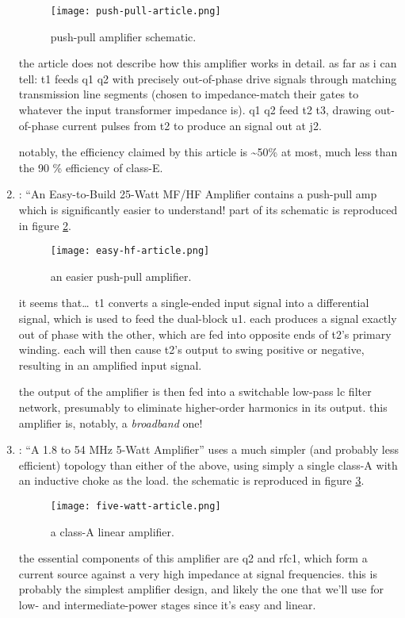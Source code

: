 \begin{enumerate}
	\begin{figure}[H]
		\centering
		\texttt{[image: push-pull-article.png]}
		\caption{push-pull amplifier schematic.}
		\label{fig:push-pull-article}
	\end{figure}

	the article does not describe how this amplifier works in detail. as
	far as i can tell: \pr t1 feeds \pr q1 \amp \pr q2 with precisely
	out-of-phase drive signals through matching transmission line segments
	 (chosen to impedance-match their gates to whatever
	the input transformer impedance is). \pr q1 \amp \pr q2 feed \pr t2
	\amp \pr t3, drawing out-of-phase current pulses from \pr t2 to produce
	an \rf signal out at \pr j2.

	notably, the efficiency claimed by this article is \textasciitilde 50\%
	at most, much less than the 90 \% efficiency of class-E.

	\item \autocite[p.~1 dash 2]{rf-amp-classics}: ``An Easy-to-Build
	25-Watt MF/HF Amplifier contains a push-pull amp which is significantly
	easier to understand! part of its schematic is reproduced in figure
	\ref{fig:easy-hf-article}.

	\begin{figure}[H]
		\centering
		\texttt{[image: easy-hf-article.png]}
		\caption{an easier push-pull amplifier.}
		\label{fig:easy-hf-article}
	\end{figure}

	it seems that\ldots\ \pr t1 converts a single-ended input signal into a
	differential signal, which is used to feed the dual-\jfet block \pr u1.
	each \jfet produces a signal exactly out of phase with the other, which
	are fed into opposite ends of \pr t2's primary winding. each \jfet will
	then cause \pr t2's output to swing positive or negative, resulting in
	an amplified input signal.

	the output of the amplifier is then fed into a switchable low-pass lc
	filter network, presumably to eliminate higher-order harmonics in its
	output. this amplifier is, notably, a \emph{broadband} one!

	\item \autocite[p.~1 dash 19]{rf-amp-classics}: ``A 1.8 to 54 MHz
	5-Watt Amplifier'' uses a much simpler (and probably less efficient)
	topology than either of the above, using simply a single \mosfet
	class-A with an inductive choke as the load. the schematic is
	reproduced in figure \ref{fig:five-watt-article}.

	\begin{figure}[H]
		\centering
		\texttt{[image: five-watt-article.png]}
		\caption{a class-A linear amplifier.}
		\label{fig:five-watt-article}
	\end{figure}

	the essential components of this amplifier are \pr q2 and \pr rfc1,
	which form a current source against a very high impedance at signal
	frequencies. this is probably the simplest \rf amplifier design, and
	likely the one that we'll use for low- and intermediate-power stages
	since it's easy and linear.
\end{enumerate}

